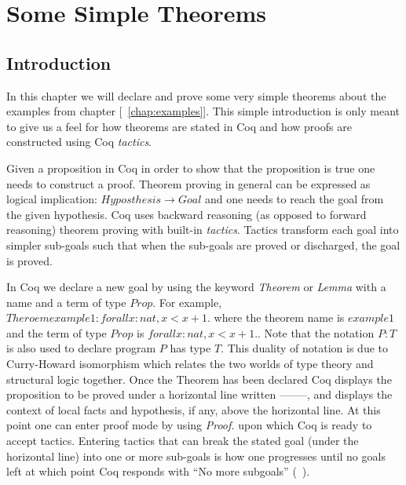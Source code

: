 \chapter{Some Simple Theorems}

\section{Introduction}

In this chapter we will declare and prove some very simple theorems about the examples from chapter [~\ref{chap:examples}]. This simple introduction is only meant to give us a feel for how theorems are stated in Coq and how proofs are constructed using Coq \emph{tactics}.


Given a proposition in Coq in order to show that the proposition is true one needs to construct a proof. Theorem proving in general can be expressed as logical implication: $Hyposthesis \rightarrow Goal$ and one needs to reach the goal from the given hypothesis. Coq uses backward reasoning (as opposed to forward reasoning) theorem proving with built-in \emph{tactics}. Tactics transform each goal into simpler sub-goals such that when the sub-goals are proved or discharged, the goal is proved. 

In Coq we declare a new goal by using the keyword \emph{Theorem} or \emph{Lemma} with a name and a term of type $Prop$. For example, $Theroem example1: forall x:nat, x < x + 1.$ where the theorem name is $example1$ and the term of type $Prop$ is $forall x:nat, x < x + 1.$. Note that the notation $P:T$ is also used to declare program $P$ has type $T$. This duality of notation is due to Curry-Howard isomorphism which relates the two worlds of type theory and structural logic together. Once the Theorem has been declared Coq displays the proposition to be proved under a horizontal line written --------, and displays the context of local facts and hypothesis, if any, above the horizontal line. At this point one can enter proof mode by using \emph{Proof.} upon which Coq is ready to accept tactics. Entering tactics that can break the stated goal (under the horizontal line) into one or more sub-goals is how one progresses until no goals left at which point Coq responds with ``No more subgoals'' (~\cite{CoqHurry}).



